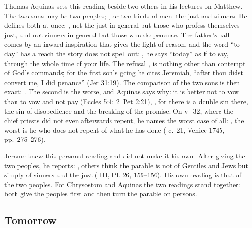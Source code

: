 Thomas Aquinas sets this reading beside two others in his lectures on Matthew.
The two sons may be two peoples; , or two kinds of men, the just and sinners. He defines both at
once: , not the just in general
but those who profess themselves just, and not sinners in general but those who
do penance. The father's call comes by an inward inspiration that gives the
light of reason, and the word ``to day'' has a reach the story does not
spell out: , he says
``today'' as if to say, through the whole time of your life. The refusal
, is nothing other than
contempt of God's commands; for the first son's going he cites Jeremiah,
``after thou didst convert me, I did penance'' (Jer 31:19). The comparison of
the two sons is then exact: . The second is the worse, and Aquinas says why: it is
better not to vow than to vow and not pay (Eccles 5:4; 2~Pet 2:21), , for
there is a double sin there, the sin of disobedience and the breaking of the
promise. On v.~32, where the chief priests did not even afterwards repent, he
names the worst case of all: , the worst is
he who does not repent of what he has done ( c.~21,
Venice 1745, pp.~275--276).

Jerome knew this personal reading and did not make it his own. After giving
the two peoples, he reports: , others think
the parable is not of Gentiles and Jews but simply of sinners and the just
( III, PL 26, 155--156). His own reading is that
of the two peoples. For Chrysostom and Aquinas the two readings stand together:
both give the peoples first and then turn the parable on persons.

\subsection{Tomorrow}

